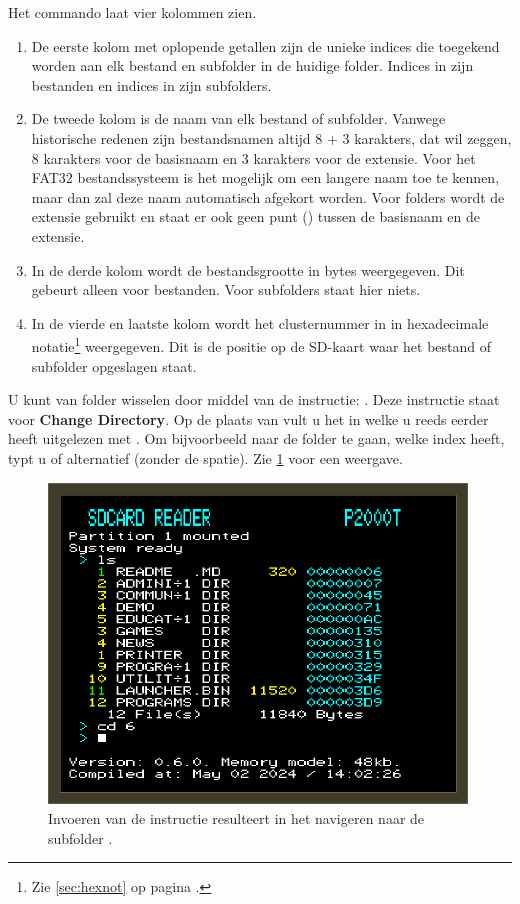 Het  commando laat vier kolommen zien. 

\begin{enumerate}[noitemsep]
    \item De eerste kolom met oplopende getallen zijn de unieke indices die toegekend worden aan elk bestand en subfolder in de huidige folder. Indices in  zijn bestanden en indices in  zijn subfolders.
    \item De tweede kolom is de naam van elk bestand of subfolder. Vanwege historische redenen zijn bestandsnamen altijd 8 + 3 karakters, dat wil zeggen, 8 karakters voor de basisnaam en 3 karakters voor de extensie. Voor het FAT32 bestandssysteem is het mogelijk om een langere naam toe te kennen, maar dan zal deze naam automatisch afgekort worden. Voor folders wordt de extensie  gebruikt en staat er ook geen punt () tussen de basisnaam en de extensie.
    \item In de derde kolom wordt de bestandsgrootte in bytes weergegeven. Dit gebeurt alleen voor bestanden. Voor subfolders staat hier niets.
    \item In de vierde en laatste kolom wordt het clusternummer in  in hexadecimale notatie\footnote{Zie \cref{sec:hexnot} op pagina \pageref{sec:hexnot}.} weergegeven. Dit is de positie op de SD-kaart waar het bestand of subfolder opgeslagen staat.
\end{enumerate}

U kunt van folder wisselen door middel van de instructie: . Deze instructie staat voor \textbf{Change Directory}. Op de plaats van  vult u het  in welke u reeds eerder heeft uitgelezen met . Om bijvoorbeeld naar de folder  te gaan, welke index  heeft, typt u  of alternatief  (zonder de spatie). Zie \cref{fig:screenshot-cd6} voor een weergave.

\begin{figure}[h!]
    \centering
    \includegraphics[width=0.99\textwidth]{img/cd6.png}
    \caption{Invoeren van de instructie  resulteert in het navigeren naar de subfolder .}
    \label{fig:screenshot-cd6}
\end{figure}

